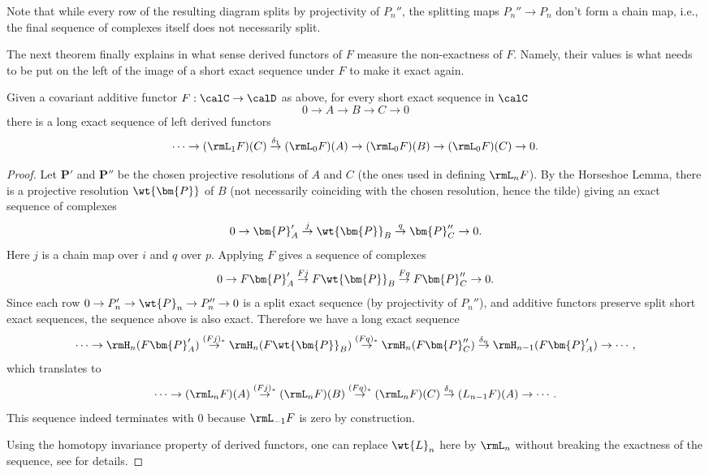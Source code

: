 \begin{rem}
    Note that while every row of the resulting diagram splits by projectivity of $P_n''$, the splitting maps $P_n''\to P_n$ don't form a chain map, i.e., the final sequence of complexes itself does not necessarily split.
\end{rem}

The next theorem finally explains in what sense derived functors of $F$ measure the non-exactness of $F$. Namely, their values is what needs to be put on the left of the image of a short exact sequence under $F$ to make it exact again.

\begin{thm}
    Given a covariant additive functor $F:\calC\to\calD$ as above, for every short exact sequence in $\calC$
    \[0\to A\to B\to C\to 0\]
    there is a long exact sequence of left derived functors 
    \[
    \cdots \to (\rmL_1 F)(C)\overset{\delta_1}\to (\rmL_0 F)(A)\to (\rmL_0 F)(B)\to (\rmL_0 F)(C)\to 0.
    \]
\end{thm}
\begin{proof}
     Let $\bm{P}'$ and $\bm{P}''$ be the chosen projective resolutions of $A$ and $C$ (the ones used in defining $\rmL_nF$). By the Horseshoe Lemma, there is a projective resolution $\wt{\bm{P}}$ of $B$ (not necessarily coinciding with the chosen resolution, hence the tilde) giving an exact sequence of complexes
     \[0\to \bm{P}'_{A}\overset j\to \wt{\bm{P}}_B \overset q\to \bm{P}''_{C}\to 0.\]
     Here $j$ is a chain map over $i$ and $q$ over $p$. Applying $F$ gives a sequence of complexes 
     \[0\to F\bm{P}'_{A}\overset {Fj}\to F\wt{\bm{P}}_B \overset {Fq}\to F\bm{P}''_{C}\to 0.\]
     Since each row $0\to P_n' \to \wt{P}_n\to P_n''\to 0$ is a split exact sequence (by projectivity of $P_{n}''$), and additive functors preserve split short exact sequences, the sequence above is also exact. Therefore we have a long exact sequence
     \[\cdots\to \rmH_n(F\bm{P}'_{A})\overset{(Fj)_\ast}\to \rmH_n(F\wt{\bm{P}}_B) \overset {(Fq)_\ast}\to \rmH_n(F\bm{P}''_{C})\overset{\delta_n}\to \rmH_{n-1}(F\bm{P}'_{A})\to \cdots,\]
     which translates to
     \[\cdots\to (\rmL_nF)(A)\overset{(Fj)_\ast}\to (\rmL_n F)(B)\overset{(Fq)_\ast}\to (\rmL_nF)(C)\overset{\delta_n}\to (L_{n-1}F)(A)\to \cdots. \]
     This sequence indeed terminates with $0$ because $\rmL_{-1}F$ is zero by construction.
     
     Using the homotopy invariance property of derived functors, one can replace $\wt{L}_n$ here by $\rmL_n$ without breaking the exactness of the sequence, see \cite[Thm. 6.27]{Rotman} for details.
\end{proof}

